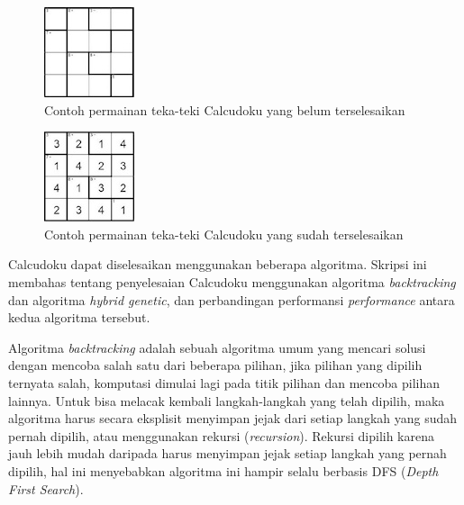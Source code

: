 \documentclass[a4paper,twoside]{article}
\begin{document}
\begin{figure}
\centering
\captionsetup{justification=centering}
\includegraphics[scale=1]{Calcudoku1}
\caption{Contoh permainan teka-teki Calcudoku yang belum terselesaikan}
\label{fig:calcudoku1}
\end{figure}

\begin{figure}
\centering
\captionsetup{justification=centering}
\includegraphics[scale=1]{Calcudoku2}
\caption{Contoh permainan teka-teki Calcudoku yang sudah terselesaikan}
\label{fig:calcudoku2}
\end{figure}

Calcudoku dapat diselesaikan menggunakan beberapa algoritma. Skripsi ini membahas tentang penyelesaian Calcudoku menggunakan algoritma \textit{backtracking} dan algoritma \textit{hybrid genetic}, dan perbandingan performansi \textit{performance} antara kedua algoritma tersebut.

Algoritma \textit{backtracking} adalah sebuah algoritma umum yang mencari solusi dengan mencoba salah satu dari beberapa pilihan, jika pilihan yang dipilih ternyata salah, komputasi dimulai lagi pada titik pilihan dan mencoba pilihan lainnya. Untuk bisa melacak kembali langkah-langkah yang telah dipilih, maka algoritma harus secara eksplisit menyimpan jejak dari setiap langkah yang sudah pernah dipilih, atau menggunakan rekursi (\textit{recursion}). Rekursi dipilih karena jauh lebih mudah daripada harus menyimpan jejak setiap langkah yang pernah dipilih, hal ini menyebabkan algoritma ini hampir selalu berbasis DFS (\textit{Depth First Search}). \cite{Fahda} 
\end{document}
